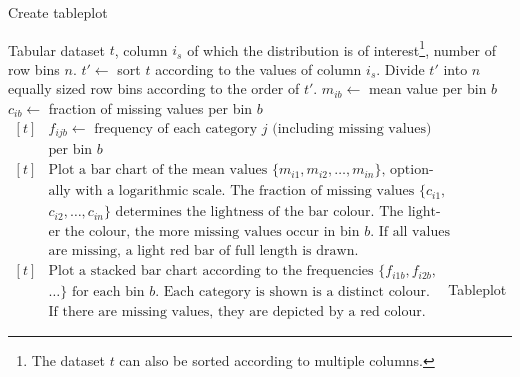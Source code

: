 \documentclass[11pt, fleqn, a4paper]{article}
\begin{document}
\begin{algorithm}[h]
\caption{Create tableplot}\label{alg}
\begin{minipage}{0.8\textwidth}
\begin{algorithmic}[1]
\Require Tabular dataset $t$, column $i_s$ of which the distribution is of interest\footnote{The dataset $t$ can also be sorted according to multiple columns.}, number of row bins $n$.
\State $t'\leftarrow$ sort $t$ according to the values of column $i_s$.
\State Divide $t'$ into $n$ equally sized row bins according to the order of $t'$.
\State $m_{ib}\leftarrow$ mean value per bin $b$
\State $c_{ib}\leftarrow$ fraction of missing values per bin $b$
\EndIf
{}
\State $\begin{aligned}[t]
		&\mbox{$f_{ijb}\leftarrow$ frequency of each category $j$ (including missing values)}\\[-3pt]
		&\mbox{per bin $b$}
	\end{aligned}$
\EndIf
\EndFor
{}
\State $\begin{aligned}[t]
		&\mbox{Plot a bar chart of the mean values $\{m_{i1}, m_{i2},\ldots, m_{in}\}$, option-}\\[-3pt]
		&\mbox{ally with a logarithmic scale. The fraction of missing values $\{c_{i1},$}\\[-3pt]
		&\mbox{$c_{i2},\ldots, c_{in}\}$ determines the lightness of the bar colour. The light-}\\[-3pt]
		&\mbox{er the colour, the more missing values occur in bin $b$. If all values}\\[-3pt]
		&\mbox{are missing, a light red bar of full length is drawn.}
	\end{aligned}$
\EndIf
{}
\State $\begin{aligned}[t]
		&\mbox{Plot a stacked bar chart according to the frequencies $\{f_{i1b}, f_{i2b},$}\\[-3pt]
		&\mbox{$\ldots\}$ for each bin $b$. Each category is shown is a distinct colour.}\\[-3pt]
		&\mbox{If there are missing values, they are depicted by a red colour.}
	\end{aligned}$
\EndIf
\EndFor
\Ensure Tableplot
\end{algorithmic}
\end{minipage}
\end{algorithm}
\end{document}

